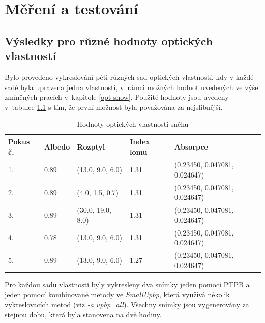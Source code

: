 \chapter{Měření a testování}
\section{Výsledky pro různé hodnoty optických vlastností}
Bylo provedeno vykreslování pěti různých sad optických vlastností, kdy v každé sadě byla upravena jedna vlastností, v~rámci možných hodnot uvedených ve výše zmíněných pracích v~kapitole \ref{opt-snow}. Použité hodnoty jsou uvedeny v~tabulce \ref{mereni-tab} s tím, že první možnost byla považována za nejslibnější.

\begin{table}[h]\centering
\begin{tabular}{|l|l|l|l|l|}
\hline
 Pokus č. &Albedo&Rozptyl&Index lomu&Absorpce  \\ \hline
 1.& 0.89 & (13.0, 9.0, 6.0) & 1.31 & (0.23450, 0.047081, 0.024647) \\ \hline
 2.& 0.89 & (4.0, 1.5, 0.7) & 1.31 & (0.23450, 0.047081, 0.024647) \\ \hline
 3.& 0.89 &(30.0, 19.0, 8.0)  & 1.31 &(0.23450, 0.047081, 0.024647)  \\ \hline  
 4.& 0.78 & (13.0, 9.0, 6.0) & 1.31 & (0.23450, 0.047081, 0.024647) \\ \hline
 5.& 0.89 & (13.0, 9.0, 6.0) & 1.27 & (0.23450, 0.047081, 0.024647) \\ \hline
\end{tabular}
\label{mereni-tab}
\caption{Hodnoty optických vlastností sněhu}
\end{table}

Pro každou sadu vlastností byly vykresleny dva snímky jeden pomocí PTPB a jeden pomocí kombinované metody ve \textit{SmallUpbp}, která využívá několik vykreslovacích metod (viz \cite{smallubpb} \textit{-a upbp\_all}). Všechny snímky jsou vygenerovány za stejnou dobu, která byla stanovena na dvě hodiny.


